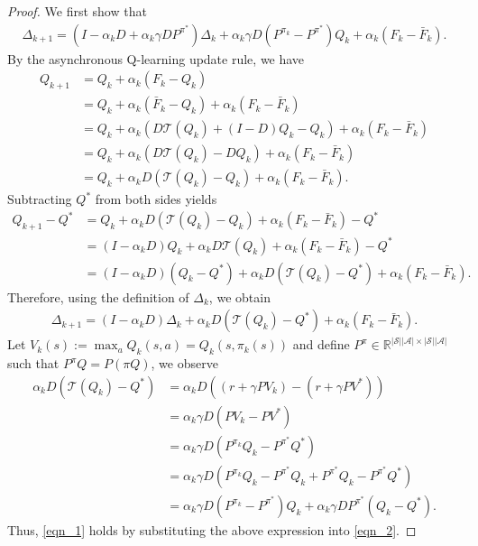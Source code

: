 \documentclass{opt2025} %
\begin{document}
\begin{proof}
We first show that
\begin{align}
\Delta_{k+1} = (I - \alpha_kD + \alpha_k \gamma D P^{\pi^*})\Delta_k + \alpha_k \gamma D(P^{\pi_k}-P^{\pi^*} )Q_k  + \alpha_k(F_k - \bar{F}_k). \label{eqn_1}
\end{align}
By the asynchronous Q-learning update rule, we have
\begin{align*}
Q_{k+1} &= Q_{k} + \alpha_k(F_k - Q_k)\\
&= Q_k + \alpha_k(\bar{F}_k - Q_k) + \alpha_k(F_k - \bar{F}_k)\\
&= Q_k + \alpha_k(D \mathcal{T}(Q_k) + (I-D) Q_k - Q_k) + \alpha_k(F_k - \bar{F}_k)\\
&= Q_k + \alpha_k(D \mathcal{T}(Q_k) - DQ_k) + \alpha_k(F_k - \bar{F}_k)\\
&= Q_k + \alpha_kD(\mathcal{T}(Q_k) - Q_k) + \alpha_k(F_k - \bar{F}_k).
\end{align*}
Subtracting $Q^*$ from both sides yields
\begin{align*}
Q_{k+1} - Q^* &= Q_k + \alpha_kD(\mathcal{T}(Q_k) - Q_k) + \alpha_k(F_k - \bar{F}_k) - Q^*\\
&= (I - \alpha_kD) Q_k + \alpha_kD\mathcal{T}(Q_k)  + \alpha_k(F_k - \bar{F}_k) - Q^*\\
&= (I - \alpha_kD) (Q_k - Q^*)+ \alpha_kD(\mathcal{T}(Q_k) - Q^*)  + \alpha_k(F_k - \bar{F}_k).
\end{align*}
Therefore, using the definition of $\Delta_k$, we obtain
\begin{align}
\Delta_{k+1} = (I - \alpha_kD)\Delta_k + \alpha_kD(\mathcal{T}(Q_k) - Q^*)  + \alpha_k(F_k - \bar{F}_k). \label{eqn_2}
\end{align}
Let $V_k(s) := \max_a Q_k(s,a) = Q_k(s,\pi_k(s))$ and define $P^{\pi} \in \mathbb{R}^{|\mathcal{S}||\mathcal{A}|\times |\mathcal{S}||\mathcal{A}|}$ such that $P^{\pi}Q=P(\pi Q)$, we observe
\begin{align*}
\alpha_kD(\mathcal{T}(Q_k) - Q^*) &= \alpha_kD( (r+ \gamma PV_k) - (r + \gamma PV^*))\\
&=\alpha_k \gamma D(PV_k -PV^*)\\
&=\alpha_k \gamma D(P^{\pi_k}Q_k - P^{\pi^*}Q^*)\\
&=\alpha_k \gamma D(P^{\pi_k}Q_k - P^{\pi^*} Q_k + P^{\pi^*} Q_k - P^{\pi^*}Q^*)\\
&=\alpha_k \gamma D(P^{\pi_k}-P^{\pi^*} )Q_k  + \alpha_k \gamma D P^{\pi^*} (Q_k - Q^*).
\end{align*}
Thus, \cref{eqn_1} holds by substituting the above expression into \cref{eqn_2}.


\end{proof}
\end{document}
